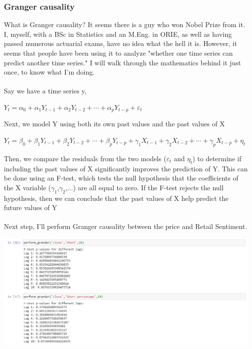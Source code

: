 \documentclass{article}
\begin{document}
\subsubsection{Granger causality}
What is Granger causality? It seems there is a guy who won Nobel Prize from it. I, myself, with a BSc in Statistics and an M.Eng. in ORIE, as well as having passed numerous actuarial exams, have no idea what the hell it is. However, it seems that people have been using it to analyze "whether one time series can predict another time series." I will walk through the mathematics behind it just once, to know what I'm doing.
\\ \\ Say we have a time series y, \\
\begin{center}
$Y_t = \alpha_0 + \alpha_1 Y_{t-1} + \alpha_2 Y_{t-2} + \cdots + \alpha_p Y_{t-p} + \varepsilon_t$
\end{center}
Next, we model Y using both its own past values and the past values of X
\begin{center}
$Y_t = \beta_0 + \beta_1 Y_{t-1} + \beta_2 Y_{t-2} + \cdots + \beta_p Y_{t-p} + \gamma_1 X_{t-1} + \gamma_2 X_{t-2} + \cdots + \gamma_p X_{t-p} + \eta_t$
\end{center}
Then, we compare the residuals from the two models ($\varepsilon_t$ and $\eta_t$) to determine if including the past values of X significantly improves the prediction of Y. This can be done using an F-test, which tests the null hypothesis that the coefficients of the X variable ($\gamma_1$,$\gamma_2$,...) are all equal to zero. If the F-test rejects the null hypothesis, then we can conclude that the past values of X help predict the future values of Y
\\ \\
Next step, I'll perform Granger causality between the price and Retail Sentiment.
\begin{center}
    \includegraphics[scale=0.7]{p6.png}    
\end{center}
\end{document}
